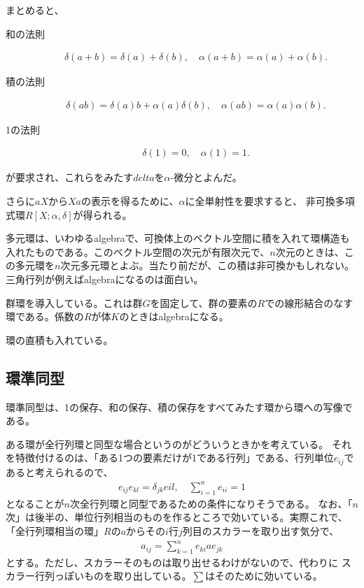 \documentclass[9pt]{ltjsarticle}
\begin{document}
まとめると、
\begin{description}
  \item[和の法則]
  \begin{align}
    \delta(a+b) = \delta(a) + \delta(b),\quad \alpha(a+b) = \alpha(a) + \alpha(b).
  \end{align}
  \item[積の法則]
  \begin{align}
    \delta(ab) = \delta(a)b + \alpha(a)\delta(b),\quad \alpha(ab)=\alpha(a)\alpha(b).
  \end{align}
  \item[1の法則]
  \begin{align}
    \delta(1) = 0,\quad \alpha(1) = 1.
  \end{align}
\end{description}
が要求され、これらをみたす$delta$を$\alpha$-微分とよんだ。

さらに$aX$から$Xa$の表示を得るために、$\alpha$に全単射性を要求すると、
非可換多項式環$R[X;\alpha,\delta]$が得られる。

多元環は、いわゆるalgebraで、可換体上のベクトル空間に積を入れて環構造も入れたものである。このベクトル空間の次元が有限次元で、$n$次元のときは、この多元環を$n$次元多元環とよぶ。当たり前だが、この積は非可換かもしれない。三角行列が例えばalgebraになるのは面白い。

群環を導入している。これは群$G$を固定して、群の要素の$R$での線形結合のなす環である。係数の$R$が体$K$のときはalgebraになる。

環の直積も入れている。

\subsection{環準同型}
\label{sub:環準同型}
環準同型は、1の保存、和の保存、積の保存をすべてみたす環から環への写像である。

ある環が全行列環と同型な場合というのがどういうときかを考えている。
それを特徴付けるのは、「ある1つの要素だけが1である行列」である、行列単位$e_{ij}$であると考えられるので、
\begin{align}
  e_{ij}e_{kl} = \delta_{jk} e{il} ,\quad \sum_{i=1}^n e_{ii} = 1
\end{align}
となることが$n$次全行列環と同型であるための条件になりそうである。
なお、「$n$次」は後半の、単位行列相当のものを作るところで効いている。実際これで、
「全行列環相当の環」$R$の$a$からその$i$行$j$列目のスカラーを取り出す気分で、
\begin{align}
  a_{ij} = \sum_{k=1}^n e_{ki}a e_{jk}
\end{align}
とする。ただし、スカラーそのものは取り出せるわけがないので、代わりに
スカラー行列っぽいものを取り出している。$\sum$はそのために効いている。
\end{document}
